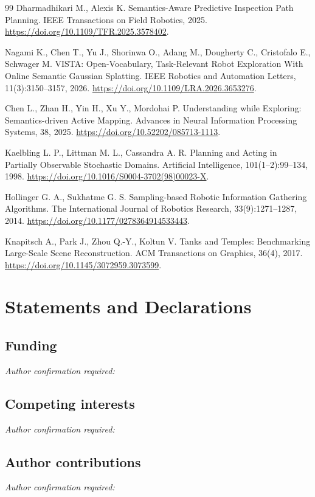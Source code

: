 \documentclass[11pt,a4paper]{article}
\begin{document}
\begin{thebibliography}{99}
 Dharmadhikari M., Alexis K. Semantics-Aware Predictive Inspection Path Planning. IEEE Transactions on Field Robotics, 2025. \url{https://doi.org/10.1109/TFR.2025.3578402}.

 Nagami K., Chen T., Yu J., Shorinwa O., Adang M., Dougherty C., Cristofalo E., Schwager M. VISTA: Open-Vocabulary, Task-Relevant Robot Exploration With Online Semantic Gaussian Splatting. IEEE Robotics and Automation Letters, 11(3):3150--3157, 2026. \url{https://doi.org/10.1109/LRA.2026.3653276}.

 Chen L., Zhan H., Yin H., Xu Y., Mordohai P. Understanding while Exploring: Semantics-driven Active Mapping. Advances in Neural Information Processing Systems, 38, 2025. \url{https://doi.org/10.52202/085713-1113}.

 Kaelbling L. P., Littman M. L., Cassandra A. R. Planning and Acting in Partially Observable Stochastic Domains. Artificial Intelligence, 101(1--2):99--134, 1998. \url{https://doi.org/10.1016/S0004-3702(98)00023-X}.

 Hollinger G. A., Sukhatme G. S. Sampling-based Robotic Information Gathering Algorithms. The International Journal of Robotics Research, 33(9):1271--1287, 2014. \url{https://doi.org/10.1177/0278364914533443}.

 Knapitsch A., Park J., Zhou Q.-Y., Koltun V. Tanks and Temples: Benchmarking Large-Scale Scene Reconstruction. ACM Transactions on Graphics, 36(4), 2017. \url{https://doi.org/10.1145/3072959.3073599}.
\end{thebibliography}

\section*{Statements and Declarations}
\subsection*{Funding}
\textit{Author confirmation required:} \underline{\hspace{5cm}}
\subsection*{Competing interests}
\textit{Author confirmation required:} \underline{\hspace{5cm}}
\subsection*{Author contributions}
\textit{Author confirmation required:} \underline{\hspace{5cm}}
\end{document}
